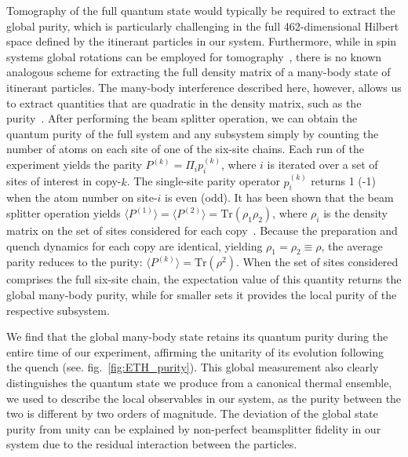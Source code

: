 Tomography of the full quantum state would typically be required to extract the global purity, which is particularly challenging in the full 462-dimensional Hilbert space defined by the itinerant particles in our system. Furthermore, while in spin systems global rotations can be employed for tomography~\cite{Sackett2000}, there is no known analogous scheme for extracting the full density matrix of a many-body state of itinerant particles. The many-body interference described here, however, allows us to extract quantities that are quadratic in the density matrix, such as the purity~\cite{Islam2015}. After performing the beam splitter operation, we can obtain the quantum purity of the full system and any subsystem simply by counting the number of atoms on each site of one of the six-site chains. Each run of the experiment yields the parity $P^{(k)} = \Pi_i p^{(k)}_i$, where $i$ is iterated over a set of sites of interest in copy-$k$. The single-site parity operator $p^{(k)}_i$ returns 1 (-1) when the atom number on site-$i$ is even (odd). It has been shown that the beam splitter operation yields $\langle P^{(1)} \rangle = \langle P^{(2)} \rangle = \mathrm{Tr}\left (\rho_1 \rho_2  \right)$, where $\rho_i$ is the density matrix on the set of sites considered for each copy~\cite{Palmer2005, Daley2012,Islam2015}. Because the preparation and quench dynamics for each copy are identical, yielding $\rho_1 = \rho_2 \equiv \rho$, the average parity reduces to the purity: $\langle P^{(k)} \rangle = \mathrm{Tr}(\rho^2)$. When the set of sites considered comprises the full six-site chain, the expectation value of this quantity returns the global many-body purity, while for smaller sets it provides the local purity of the respective subsystem.

We find that the global many-body state retains its quantum purity during the entire time of our experiment, affirming the unitarity of its evolution following the quench (see. fig.~\ref{fig:ETH_purity}). This global measurement also clearly distinguishes the quantum state we produce from a canonical thermal ensemble, we used to describe the local observables in our system, as the purity between the two is different by two orders of magnitude. The deviation of the global state purity from unity can be explained by non-perfect beamsplitter fidelity in our system due to the residual interaction between the particles.

